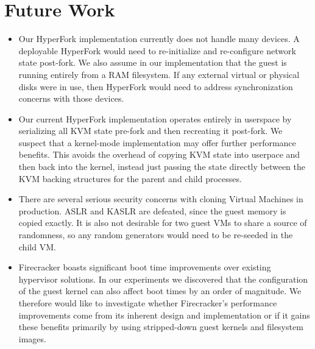 \section{Future Work}



\begin{itemize}
  \item Our HyperFork implementation currently does not handle many devices. A deployable HyperFork would need to re-initialize and re-configure network state post-fork. We also assume in our implementation that the guest is running entirely from a RAM filesystem. If any external virtual or physical disks were in use, then HyperFork would need to address synchronization concerns with those devices.
  \item Our current HyperFork implementation operates entirely in userspace by serializing all KVM state pre-fork and then recreating it post-fork. We suspect that a kernel-mode implementation may offer further performance benefits. This avoids the overhead of copying KVM state into userpace and then back into the kernel, instead just passing the state directly between the KVM backing structures for the parent and child processes.
  \item There are several serious security concerns with cloning Virtual Machines in production. ASLR and KASLR are defeated, since the guest memory is copied exactly. It is also not desirable for two guest VMs to share a source of randomness, so any random generators would need to be re-seeded in the child VM.
  \item Firecracker boasts significant boot time improvements over existing hypervisor solutions. In our experiments we discovered that the configuration of the guest kernel can also affect boot times by an order of magnitude. We therefore would like to investigate whether Firecracker's performance improvements come from its inherent design and implementation or if it gains these benefits primarily by using stripped-down guest kernels and filesystem images.
\end{itemize}

